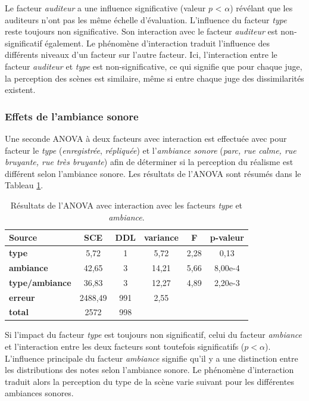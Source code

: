 Le facteur \textit{auditeur} a une influence significative (valeur $p$ < $\alpha$) révélant que les auditeurs n'ont pas les même échelle d'évaluation. L'influence du facteur \textit{type} reste toujours non significative. Son interaction avec le facteur \textit{auditeur} est non-significatif également.
Le phénomène d'interaction traduit l'influence des différents niveaux d'un facteur sur l'autre facteur. Ici, l'interaction entre le facteur \textit{auditeur} et \textit{type} est non-significative, ce qui signifie que pour chaque juge, la perception des scènes est similaire, même si entre chaque juge des dissimilarités existent.

\subsubsection{Effets de l'ambiance sonore}

Une seconde ANOVA à deux facteurs avec interaction est effectuée avec pour facteur le \textit{type} (\textit{enregistrée}, \textit{répliquée}) et l'\textit{ambiance sonore} (\textit{parc, rue calme, rue bruyante, rue très bruyante}) afin de déterminer si la perception du réalisme est différent selon l'ambiance sonore. Les résultats de l'ANOVA sont résumés dans le Tableau \ref{tab:anova_ambiance}.

\begin{table}[ht]
\centering
\begin{tabular}{lccccc}
\hline
\textbf{Source}     & \textbf{SCE} & \textbf{DDL} & \textbf{variance} & \textbf{F} & \textbf{p-valeur} \\
\hline
\textbf{type} & 5,72 & 1 & 5,72 & 2,28 & 0,13 \\
\hline
\textbf{ambiance} & 42,65 & 3 & 14,21 & 5,66 & 8,00e-4 \\
\hline
\textbf{type/ambiance} & 36,83 & 3 & 12,27 & 4,89 & 2,20e-3 \\
\hline
\textbf{erreur}      & 2488,49 & 991 & 2,55 & &  \\
\hline
\textbf{total}      & 2572 & 998 & & & \\
\hline
\end{tabular}
\caption{Résultats de l'ANOVA avec interaction avec les facteurs \textit{type} et \textit{ambiance}.}
\label{tab:anova_ambiance}
\end{table}


Si l'impact du facteur \textit{type} est toujours non significatif, celui du facteur \textit{ambiance} et l'interaction entre les deux facteurs sont toutefois significatifs ($p < \alpha$). L'influence principale du facteur \textit{ambiance} signifie qu'il y a une distinction entre les distributions des notes selon l'ambiance sonore. Le phénomène d'interaction traduit alors la perception du type de la scène varie suivant pour les différentes ambiances sonores.

